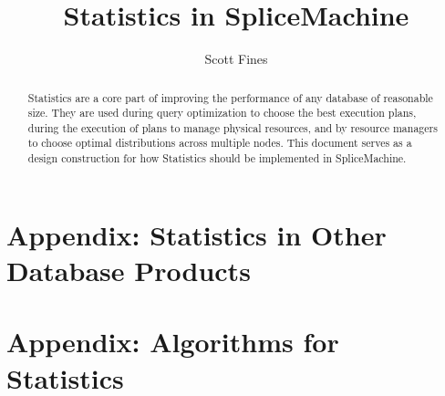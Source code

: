 \documentclass[10pt]{amsart}
\begin{document}
\title{Statistics in SpliceMachine}
\author{Scott Fines}

\begin{abstract}
				Statistics are a core part of improving the performance of any database of reasonable size. They are used during query optimization to choose the best execution plans, during the execution of plans to manage physical resources, and by resource managers to choose optimal distributions across multiple nodes. This document serves as a design construction for how Statistics should be implemented in SpliceMachine.
\end{abstract}

\maketitle


\clearpage
\begin{subappendices}
				\label{sec:Appendix}
				\section*{Appendix: Statistics in Other Database Products}
				\label{sec:OtherDBs}
				
				\clearpage
				\section*{Appendix: Algorithms for Statistics}
				\label{sec:Algorithms}
				
\end{subappendices}

\clearpage
\printbibliography
\end{document}
